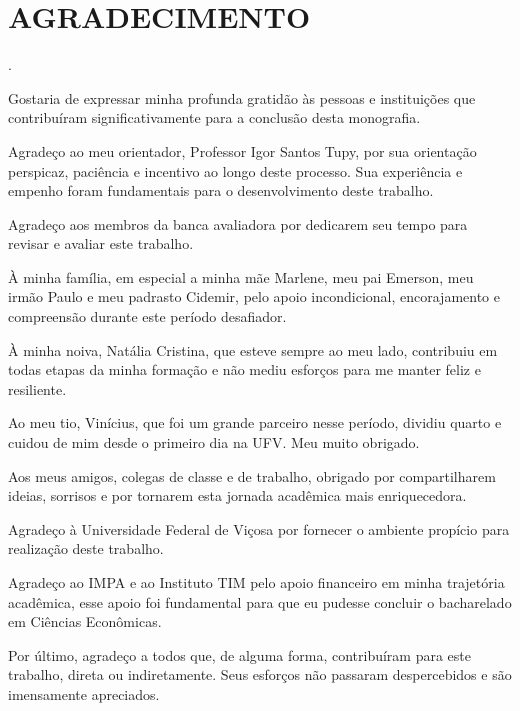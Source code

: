 \documentclass[a4paper,12pt]{article}
\newenvironment{invisible}{\color{white}}{}
\begin{document}
\newpage
\pagestyle{fancy}

\newcommand{\resumo}{%
\titleformat{\section}[block]{\bfseries\filcenter}{}{1em}{}
}
\resumo

\section*{AGRADECIMENTO}
\justify

\begin{invisible}
.
\end{invisible}

Gostaria de expressar minha profunda gratidão às pessoas e instituições que contribuíram significativamente para a conclusão desta monografia.

Agradeço ao meu orientador, Professor Igor Santos Tupy, por sua orientação perspicaz, paciência e incentivo ao longo deste processo. Sua experiência e empenho foram fundamentais para o desenvolvimento deste trabalho.

Agradeço aos membros da banca avaliadora por dedicarem seu tempo para revisar e avaliar este trabalho.

À minha família, em especial a minha mãe Marlene, meu pai Emerson, meu irmão Paulo e meu padrasto Cidemir, pelo apoio incondicional, encorajamento e compreensão durante este período desafiador.

À minha noiva, Natália Cristina, que esteve sempre ao meu lado, contribuiu em todas etapas da minha formação e não mediu esforços para me manter feliz e resiliente.

Ao meu tio, Vinícius, que foi um grande parceiro nesse período, dividiu quarto e cuidou de mim desde o primeiro dia na UFV. Meu muito obrigado.

Aos meus amigos, colegas de classe e de trabalho, obrigado por compartilharem ideias, sorrisos e por tornarem esta jornada acadêmica mais enriquecedora.

Agradeço à Universidade Federal de Viçosa por fornecer o ambiente propício para realização deste trabalho.

Agradeço ao IMPA e ao Instituto TIM pelo apoio financeiro em minha trajetória acadêmica, esse apoio foi fundamental para que eu pudesse concluir o bacharelado em Ciências Econômicas.

Por último, agradeço a todos que, de alguma forma, contribuíram para este trabalho, direta ou indiretamente. Seus esforços não passaram despercebidos e são imensamente apreciados.
\end{document}
